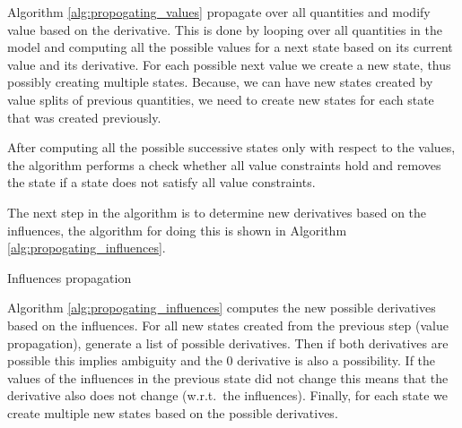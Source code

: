 \documentclass[a4paper]{article}
\begin{document}
Algorithm \ref{alg:propogating_values} propagate over all quantities and modify value based on the derivative. This is done by looping over all quantities in the model and computing all the possible values for a next state based on its current value and its derivative. For each possible next value we create a new state, thus possibly creating multiple states. Because, we can have new states created by value splits of previous quantities, we need to create new states for each state that was created previously.


After computing all the possible successive states only with respect to the values, the algorithm performs a check whether all value constraints hold and removes the state if a state does not satisfy all value constraints.

The next step in the algorithm is to determine new derivatives based on the influences, the algorithm for doing this is shown in Algorithm \ref{alg:propogating_influences}.

\vspace{12pt}
\begin{algorithm}[H]

\caption{Influences propagation}
\label{alg:propogating_influences}
\end{algorithm}
\vspace{12pt}

Algorithm \ref{alg:propogating_influences} computes the new possible derivatives based on the influences. For all new states created from the previous step (value propagation), generate a list of possible derivatives. Then if both derivatives are possible this implies ambiguity and the 0 derivative is also a possibility. If the values of the influences in the previous state did not change this means that the derivative also does not change (w.r.t.\ the influences). Finally, for each state we create multiple new states based on the possible derivatives.
\end{document}

